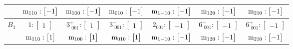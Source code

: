 \documentclass[fleqn,8pt,landscape]{jsarticle}
\begin{document}
\begin{longtable}{ccccccc}
& $ {\rm m}_{110}:\begin{bmatrix} -1 \end{bmatrix} $ & $ {\rm m}_{100}:\begin{bmatrix} -1 \end{bmatrix} $ & $ {\rm m}_{010}:\begin{bmatrix} -1 \end{bmatrix} $ & $ {\rm m}_{1-10}:\begin{bmatrix} -1 \end{bmatrix} $ & $ {\rm m}_{120}:\begin{bmatrix} -1 \end{bmatrix} $ & $ {\rm m}_{210}:\begin{bmatrix} -1 \end{bmatrix} $ \\ \hline
$ B_{1} $ & $ 1:\begin{bmatrix} 1 \end{bmatrix} $ & $ 3^{+}_{\,\,001}:\begin{bmatrix} 1 \end{bmatrix} $ & $ 3^{-}_{\,\,001}:\begin{bmatrix} 1 \end{bmatrix} $ & $ 2{}_{001}:\begin{bmatrix} -1 \end{bmatrix} $ & $ 6^{-}_{\,\,001}:\begin{bmatrix} -1 \end{bmatrix} $ & $ 6^{+}_{\,\,001}:\begin{bmatrix} -1 \end{bmatrix} $ \\
& $ {\rm m}_{110}:\begin{bmatrix} 1 \end{bmatrix} $ & $ {\rm m}_{100}:\begin{bmatrix} 1 \end{bmatrix} $ & $ {\rm m}_{010}:\begin{bmatrix} 1 \end{bmatrix} $ & $ {\rm m}_{1-10}:\begin{bmatrix} -1 \end{bmatrix} $ & $ {\rm m}_{120}:\begin{bmatrix} -1 \end{bmatrix} $ & $ {\rm m}_{210}:\begin{bmatrix} -1 \end{bmatrix} $ \\ \hline

\end{longtable}
\end{document}

